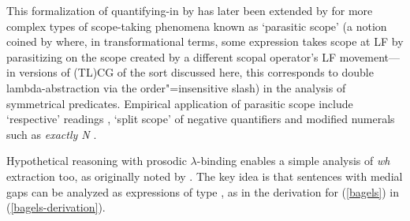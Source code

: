 \documentclass[output=paper]{langsci/langscibook}
\begin{document}
This formalization of quantifying-in by \citet{oehrle1994} has later been
extended by \citet{barker07} for more complex types of scope-taking
phenomena known as `parasitic scope' (a notion coined by
\citet{barker07} where, in transformational terms, some  expression
takes scope at LF by parasitizing on the scope created by
a different scopal operator's LF movement---in versions of
(TL)CG  of the sort discussed here, this corresponds to 
double lambda-abstraction via the order"=insensitive slash) in the
analysis of symmetrical predicates. 
Empirical application of parasitic scope include `respective' readings
\citep{kubota-levine14fg}, `split scope' of negative quantifiers
\citep{kubota-levine-gapping} and modified numerals such as \textit{exactly N}
\citep{pollard-numerical}.

Hypothetical reasoning with prosodic $\lambda$-binding enables a simple
analysis of \textit{wh} extraction too, as originally noted by \citet{muskens03}.
The key idea is that sentences with medial gaps can be analyzed
as expressions  of type , as in the derivation for
(\ref{bagels}) in (\ref{bagels-derivation}).
\end{document}
